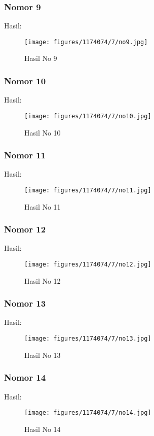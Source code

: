 \subsubsection{Nomor 9}
\hfill\break

Hasil:
\begin{figure}[H]
\centering
	\texttt{[image: figures/1174074/7/no9.jpg]}
	\caption{Hasil No 9}
\end{figure}

\subsubsection{Nomor 10}
\hfill\break

Hasil:
\begin{figure}[H]
\centering
	\texttt{[image: figures/1174074/7/no10.jpg]}
	\caption{Hasil No 10}
\end{figure}

\subsubsection{Nomor 11}
\hfill\break

Hasil:
\begin{figure}[H]
\centering
	\texttt{[image: figures/1174074/7/no11.jpg]}
	\caption{Hasil No 11}
\end{figure}

\subsubsection{Nomor 12}
\hfill\break

Hasil:
\begin{figure}[H]
\centering
	\texttt{[image: figures/1174074/7/no12.jpg]}
	\caption{Hasil No 12}
\end{figure}

\subsubsection{Nomor 13}
\hfill\break

Hasil:
\begin{figure}[H]
\centering
	\texttt{[image: figures/1174074/7/no13.jpg]}
	\caption{Hasil No 13}
\end{figure}

\subsubsection{Nomor 14}
\hfill\break

Hasil:
\begin{figure}[H]
\centering
	\texttt{[image: figures/1174074/7/no14.jpg]}
	\caption{Hasil No 14}
\end{figure}

